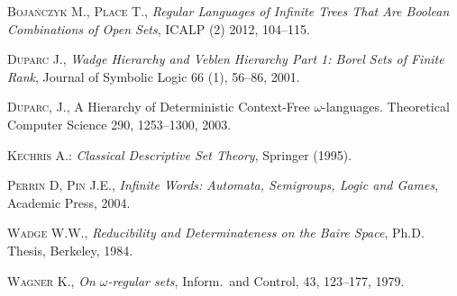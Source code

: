 \begin{thebibliography}{00}

\textsc{Boja\'nczyk} M., \textsc{Place} T., \emph{Regular Languages of Infinite Trees That Are Boolean Combinations of Open Sets}, ICALP (2) \textsc{2012}, 104--115.


\textsc{Duparc} J., \emph{Wadge Hierarchy and Veblen Hierarchy Part 1: Borel Sets of Finite Rank}, Journal of Symbolic Logic \textsc{66} (1), 56--86, 2001.


\textsc{Duparc}, J., A Hierarchy of Deterministic Context-Free $\omega$-languages.
Theoretical Computer Science \textsc{290}, 1253--1300, 2003.



\textsc{Kechris} A.: \emph{Classical Descriptive Set Theory}, Springer (1995).


\textsc{Perrin} D, \textsc{Pin} J.E., \emph{Infinite Words: Automata, Semigroups, Logic and Games}, Academic Press, \textsc{2004}.

\textsc{Wadge} W.W., \emph{Reducibility and Determinateness on the Baire Space}, Ph.D. Thesis, Berkeley, \textsc{1984}.

\textsc{Wagner} K., \emph{On $\omega$-regular sets}, Inform.~and Control, \textsc{43}, 123--177, 1979. 

\end{thebibliography}
